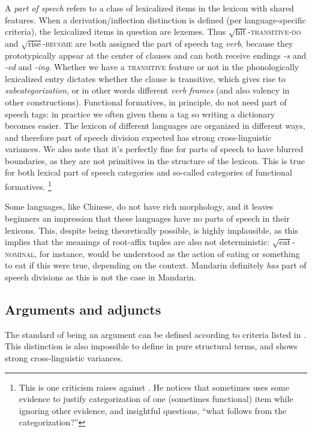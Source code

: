 \documentclass[UTF8, a4paper, oneside, scheme=plain, 12pt]{ctexrep}
\newcommand*{\term}[1]{\emph{#1}}
\newcommand{\form}[1]{\emph{#1}}
\newcommand*{\category}[1]{\textsc{#1}}
\newcommand*{\wordroot}[1]{$\sqrt{\text{#1}}$}
\begin{document}
{A \term{part of speech} refers to a class of lexicalized items in the lexicon with shared features.
When a derivation/inflection distinction is defined (per language-specific criteria),
the lexicalized items in question are lexemes.
Thus \wordroot{hit}-\category{transitive}-\category{do}
and \wordroot{rise}-\category{become}
are both assigned the part of speech tag \term{verb},
because they prototypically appear at the center of clauses
and can both receive endings \form{-s} and \form{-ed} and \form{-ing}.
Whether we have a \category{transitive} feature or not in the phonologically lexicalized entry
dictates whether the clause is transitive,
which gives rise to \term{subcategorization}, or in other words different \term{verb frames}
(and also valency in other constructions).
Functional formatives, in principle, do not need part of speech tags:
in practice we often given them a tag so writing a dictionary becomes easier.
The lexicon of different languages are organized in different ways,
and therefore part of speech division expected has strong cross-linguistic variances.
We also note that it's perfectly fine for parts of speech to have blurred boundaries,
as they are not primitives in the structure of the lexicon.
This is true for both lexical part of speech categories and
so-called categories of functional formatives.%
\footnote{
    This is one criticism \citet{culicover2004cambridge} raises against \citet{cgel}.
    He notices that \citet{cgel} sometimes uses some evidence to 
    justify categorization of one (sometimes functional) item while ignoring other evidence,
    and insightful questions, ``what follows from the categorization?''
}

Some languages, like Chinese, do not have rich morphology,
and it leaves beginners an impression that these languages have no parts of speech in their lexicons.
This, despite being theoretically possible, is highly implausible,
as this implies that the meanings of root-affix tuples are also not deterministic:
\wordroot{eat}-\category{nominal}, for instance,
would be understood as the action of eating or something to eat if this were true,
depending on the context.
Mandarin definitely \emph{has} part of speech divisions
as this is not the case in Mandarin.

\subsection{Arguments and adjuncts}

The standard of being an argument can be defined according to 
criteria listed in .
This distinction is also impossible to define in pure structural terms,
and shows strong cross-linguistic variances.

}
\end{document}
